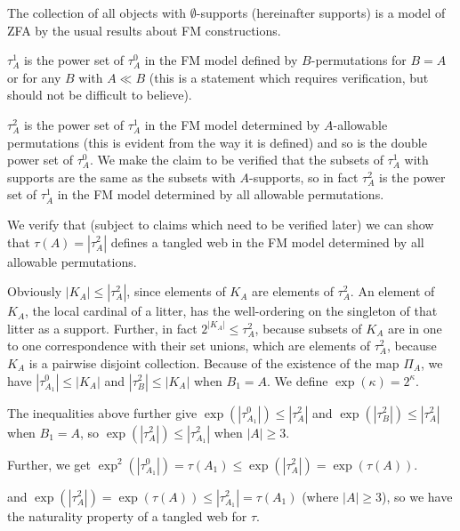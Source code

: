 \documentclass{slides}
\begin{document}
\begin{slide}

The collection of all objects with $\emptyset$-supports (hereinafter supports) is a model of ZFA by the usual results about FM constructions.

$\tau^1_A$ is the power set of $\tau^0_A$ in the FM model defined by $B$-permutations for $B=A$ or for any $B$ with $A \ll B$ (this is a statement which requires verification, but should not be difficult to believe).

$\tau^2_A$ is the power set of $\tau^1_A$ in the FM model determined by $A$-allowable permutations (this is evident from the way it is defined) and so is the double power set of $\tau^0_A$.  We make the claim to be verified that the subsets of $\tau^1_A$ with supports are the same as the subsets with $A$-supports, so in fact $\tau^2_A$ is the power set of $\tau^1_A$ in the FM model determined by all allowable permutations.

\end{slide}

\begin{slide}

We verify that (subject to claims which need to be verified later) we can show that $\tau(A) = |\tau^2_A|$ defines a tangled web in the FM model determined by all allowable permutations.

Obviously $|K_A| \leq |\tau^2_A|$, since elements of $K_A$ are elements of $\tau^2_A$.  An element of $K_A$, the local cardinal of a litter, has the well-ordering on the singleton of that litter
as a support.  Further, in fact $2^{|K_A|} \leq \tau^2_A$, because subsets of $K_A$ are in one to one correspondence with their set unions, which are elements of
$\tau^2_A$, because $K_A$ is a pairwise disjoint collection.  Because of the existence of the map $\Pi_A$, we have $|\tau^0_{A_1}| \leq |K_A|$ and
$|\tau^2_B| \leq |K_A|$ when $B_1=A$.  We define $\exp(\kappa) = 2^\kappa$.

\end{slide}

\begin{slide}

The inequalities above further give $\exp(|\tau^0_{A_1}|) \leq |\tau^2_A|$ and $\exp(|\tau^2_B|) \leq |\tau^2_A|$ when $B_1=A$, so $\exp(|\tau^2_{A}|) \leq |\tau^2_{A_1}|$ when $|A|\geq 3$.

Further, we get $\exp^2(|\tau^0_{A_1}|) = \tau(A_1) \leq \exp(|\tau^2_A|) = \exp(\tau(A))$.

and $\exp(|\tau^2_{A}|) = \exp(\tau(A)) \leq |\tau^2_{A_1}| = \tau(A_1)$ (where $|A| \geq 3$), so we have the naturality property of a tangled web for $\tau$.

\end{slide}
\end{document}
